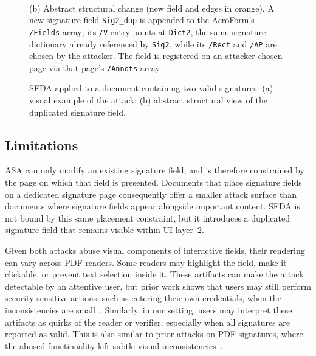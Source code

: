 \documentclass[12pt]{article}
\begin{document}
\begin{figure}[ht]
\begin{minipage}{\linewidth}
\\[3pt]
		{\footnotesize (b) Abstract structural change (new field and edges in orange). A new signature field \texttt{Sig2\_dup} is appended to the AcroForm's \texttt{/Fields} array; its \texttt{/V} entry points at \texttt{Dict2}, the same signature dictionary already referenced by \texttt{Sig2}, while its \texttt{/Rect} and \texttt{/AP} are chosen by the attacker. The field is registered on an attacker-chosen page via that page's \texttt{/Annots} array.}
	\end{minipage}
	\caption{SFDA applied to a document containing two valid signatures: (a) visual example of the attack; (b) abstract structural view of the duplicated signature field.\label{fig:sfda-example}}
\end{figure}

\subsection{Limitations}

ASA can only modify an existing signature field, and is therefore constrained by the page on which that field is presented. Documents that place signature fields on a dedicated signature page consequently offer a smaller attack surface than documents where signature fields appear alongside important content. SFDA is not bound by this same placement constraint, but it introduces a duplicated signature field that remains visible within UI-layer~2.

Given both attacks abuse visual components of interactive fields, their rendering can vary across PDF readers. Some readers may highlight the field, make it clickable, or prevent text selection inside it. These artifacts can make the attack detectable by an attentive user, but prior work shows that users may still perform security-sensitive actions, such as entering their own credentials, when the inconsistencies are small~\cite{phishing-password-managers}. Similarly, in our setting, users may interpret these artifacts as quirks of the reader or verifier, especially when all signatures are reported as valid. This is also similar to prior attacks on PDF signatures, where the abused functionality left subtle visual inconsistencies~\cite{pdf-certification-attack}.
\end{document}
